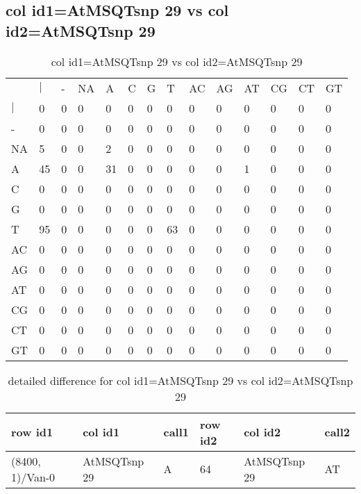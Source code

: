 \subsection{col id1=AtMSQTsnp 29 vs col id2=AtMSQTsnp 29}
\begin{center}
\begin{longtable}{|l|l|l|l|l|l|l|l|l|l|l|l|l|l|}
\caption{col id1=AtMSQTsnp 29 vs col id2=AtMSQTsnp 29} \label{table_dm630}\\
\hline
\\
\hline
&$|$&-&NA&A&C&G&T&AC&AG&AT&CG&CT&GT\\
$|$&0&0&0&0&0&0&0&0&0&0&0&0&0\\
-&0&0&0&0&0&0&0&0&0&0&0&0&0\\
NA&5&0&0&2&0&0&0&0&0&0&0&0&0\\
A&45&0&0&31&0&0&0&0&0&1&0&0&0\\
C&0&0&0&0&0&0&0&0&0&0&0&0&0\\
G&0&0&0&0&0&0&0&0&0&0&0&0&0\\
T&95&0&0&0&0&0&63&0&0&0&0&0&0\\
AC&0&0&0&0&0&0&0&0&0&0&0&0&0\\
AG&0&0&0&0&0&0&0&0&0&0&0&0&0\\
AT&0&0&0&0&0&0&0&0&0&0&0&0&0\\
CG&0&0&0&0&0&0&0&0&0&0&0&0&0\\
CT&0&0&0&0&0&0&0&0&0&0&0&0&0\\
GT&0&0&0&0&0&0&0&0&0&0&0&0&0\\
\hline
\end{longtable}
\end{center}

\begin{center}
\begin{longtable}{|l|l|l|l|l|l|}
\caption{detailed difference for col id1=AtMSQTsnp 29 vs col id2=AtMSQTsnp 29} \label{table_dm631}\\
\hline
row id1&col id1&call1&row id2&col id2&call2\\
\hline
(8400, 1)/Van-0&AtMSQTsnp 29&A&64&AtMSQTsnp 29&AT\\
\hline
\end{longtable}
\end{center}

